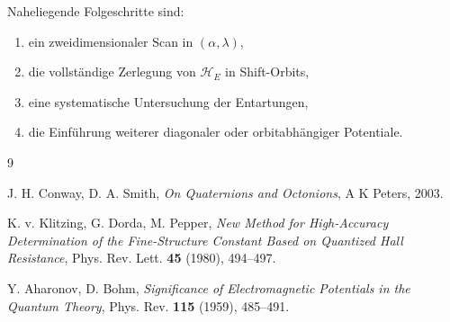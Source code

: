 \documentclass[11pt,a4paper]{article}
\theoremstyle{remark}
\newcommand{\HE}{\mathcal H_E}
\begin{document}
	Naheliegende Folgeschritte sind:
	\begin{enumerate}[label=(\arabic*)]
		\item ein zweidimensionaler Scan in \((\alpha,\lambda)\),
		\item die vollständige Zerlegung von \(\HE\) in Shift-Orbits,
		\item eine systematische Untersuchung der Entartungen,
		\item die Einführung weiterer diagonaler oder orbitabhängiger Potentiale.
	\end{enumerate}
	
	\begin{thebibliography}{9}
		
		J. H. Conway, D. A. Smith,
		\textit{On Quaternions and Octonions},
		A K Peters, 2003.
		
		K. v. Klitzing, G. Dorda, M. Pepper,
		\textit{New Method for High-Accuracy Determination of the Fine-Structure Constant Based on Quantized Hall Resistance},
		Phys. Rev. Lett. \textbf{45} (1980), 494--497.
		
		Y. Aharonov, D. Bohm,
		\textit{Significance of Electromagnetic Potentials in the Quantum Theory},
		Phys. Rev. \textbf{115} (1959), 485--491.
		
	\end{thebibliography}
	
\end{document}
